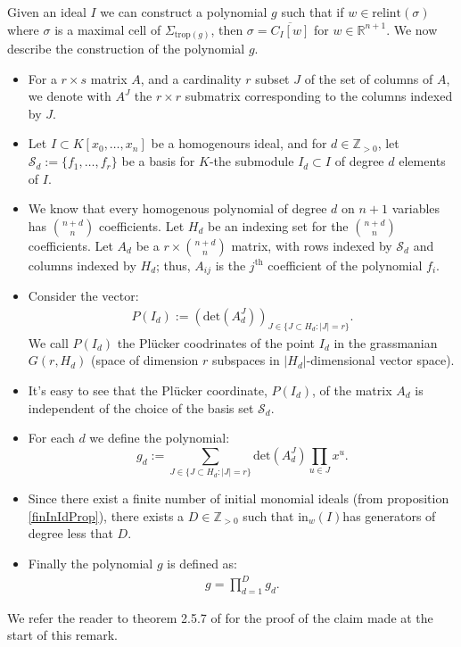 \begin{remark}
    Given an ideal $I$ we can construct a polynomial $g$ such that if $w \in \text{relint}(\sigma)$ where $\sigma$ is a maximal cell of $\Sigma_{\text{trop}(g)}$, then $\sigma = \overline{C_I[w]}$ for $w \in \mathbb{R}^{n+1}$. 
    We now describe the construction of the polynomial $g$. 
    \begin{itemize}
        \item For a $r \times s$ matrix $A$, and a cardinality $r$ subset $J$ of the set of columns of $A$, we denote with $A^{J}$ the $r \times r$ submatrix corresponding to the columns indexed by $J$.
        \item Let $I \subset K[x_{0}, \dots, x_{n}]$ be a homogenours ideal, and for $d \in \mathbb{Z}_{>0}$, let $\mathcal{S}_{d}:=\{f_{1},\dots, f_{r}\}$ be a basis for $K$-the submodule $I_{d}\subset I$ of degree $d$ elements of $I$.
        \item We know that every homogenous polynomial of degree $d$ on $n+1$ variables has $\binom{n+d}{n}$ coefficients. 
            Let $H_{d}$ be an indexing set for the $\binom{n+d}{n}$ coefficients.
            Let $A_{d}$ be a $r \times \binom{n+d}{n}$ matrix, with rows indexed by $\mathcal{S}_{d}$ and columns indexed by $H_{d}$; thus, $A_{ij}$ is the $j^{\text{th}}$ coefficient of the polynomial $f_{i}$.
        \item Consider the vector:
            \begin{align*}
                P(I_{d}) := (\text{det}(A_{d}^{J}))_{ J \in \{{J \subset H_{d}: |J| = r}\}}.
            \end{align*}
            We call $P(I_{d})$ the Pl\"{u}cker coodrinates of the point $I_{d}$ in the grassmanian $G(r, H_{d})$ (space of dimension $r$ subspaces in $|H_{d}|$-dimensional vector space).
        \item It's easy to see that the Pl\"{u}cker coordinate, $P(I_{d})$, of the matrix $A_{d}$ is independent of the choice of the basis set $\mathcal{S}_{d}$.
        \item For each $d$ we define the polynomial:
            \begin{equation*}
                g_{d}:=\sum_{J \in \{{J \subset H_{d}: |J| = r}\}} \text{det}(A^{J}_{d}) \prod_{u \in J}x^{u}.
            \end{equation*}
        \item Since there exist a finite number of initial monomial ideals (from proposition \ref{finInIdProp}), there exists a $D \in \mathbb{Z}_{>0}$ such that $\text{in}_{w}(I)$has generators of degree less that $D$.
        \item Finally the polynomial $g$ is defined as:
            \begin{align*}
                g = \prod_{d = 1}^{D} g_{d}.
            \end{align*}
    \end{itemize}
    We refer the reader to theorem 2.5.7 of \cite{maclagan2015introduction} for the proof of the claim made at the start of this remark.
\end{remark}

